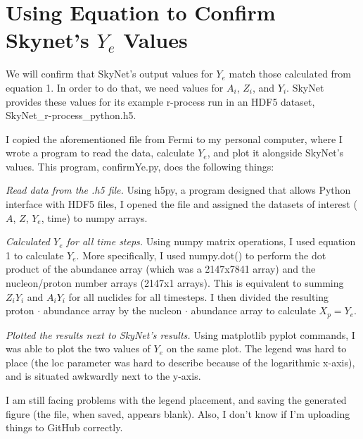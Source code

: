 \documentclass[11pt, letterpaper]{article}
\begin{document}
\section{Using Equation to Confirm Skynet's $Y_e$ Values}

\indent We will confirm that SkyNet's output values for $Y_e$ match those calculated from equation 1. In order to do that, we need values for $A_i$, $Z_i$, and $Y_i$. SkyNet provides these values for its example r-process run in an HDF5 dataset, SkyNet\_r-process\_python.h5.

\indent I copied the aforementioned file from Fermi to my personal computer, where I wrote a program to read the data, calculate $Y_e$, and plot it alongside SkyNet's values. This program, confirmYe.py, does the following things:

\indent \textit{Read data from the .h5 file.} Using h5py, a program designed that allows Python interface with HDF5 files, I opened the file and assigned the datasets of interest ($A$, $Z$, $Y_e$, time) to numpy arrays.

\indent \textit{Calculated $Y_e$ for all time steps.} Using numpy matrix operations, I used equation 1 to calculate $Y_e$. More specifically, I used numpy.dot() to perform the dot product of the abundance array (which was a 2147x7841 array) and the nucleon/proton number arrays (2147x1 arrays). This is equivalent to summing $Z_iY_i$ and $A_iY_i$ for all nuclides for all timesteps. I then divided the resulting proton  $\cdot$ abundance array by the nucleon $\cdot$ abundance array to calculate $X_p = Y_e$.

\indent\textit{Plotted the results next to SkyNet's results.} Using matplotlib pyplot commands, I was able to plot the two values of $Y_e$ on the same plot. The legend was hard to place (the loc parameter was hard to describe because of the logarithmic x-axis), and is situated awkwardly next to the y-axis.

\indent I am still facing problems with the legend placement, and saving the generated figure (the file, when saved, appears blank). Also, I don't know if I'm uploading things to GitHub correctly.
\end{document}
